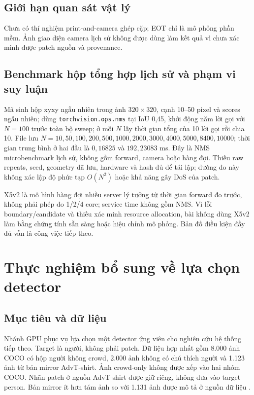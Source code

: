 \documentclass[a4paper,fleqn]{cas-dc}
\newif\ifbranchB
\begin{document}
\subsection{Giới hạn quan sát vật lý}
Chưa có thí nghiệm print-and-camera ghép cặp; EOT chỉ là mô phỏng phần mềm. Ảnh giao diện camera lịch sử không được dùng làm kết quả vì chưa xác minh được patch nguồn và provenance.

\subsection{Benchmark hộp tổng hợp lịch sử và phạm vi suy luận}
Mã  sinh hộp xyxy ngẫu nhiên trong ảnh $320\times320$, cạnh 10--50 pixel và scores ngẫu nhiên; dùng \texttt{torchvision.ops.nms} tại IoU 0,45, khởi động năm lời gọi với $N=100$ trước toàn bộ sweep; ở mỗi $N$ lấy thời gian tổng của 10 lời gọi rồi chia 10. File  lưu $N=10,\allowbreak 50,\allowbreak 100,\allowbreak 200,\allowbreak 500,\allowbreak 1000,\allowbreak 2000,\allowbreak 3000,\allowbreak 4000,\allowbreak 5000,\allowbreak 8400,\allowbreak 10000$; thời gian trung bình ở hai đầu là $0{,}16825$ và $192{,}23083$ ms. Đây là NMS microbenchmark lịch sử, không gồm forward, camera hoặc hàng đợi. Thiếu raw repeats, seed, geometry đã lưu, hardware và hash đủ để tái lập; đường đo này không xác lập độ phức tạp $O(N^2)$ hoặc khả năng gây DoS của patch.

X5v2 là mô hình hàng đợi nhiều server lý tưởng từ thời gian forward đo trước, không phải phép đo 1/2/4 core; service time không gồm NMS. Vì lỗi boundary/candidate và thiếu xác minh resource allocation, bài không dùng X5v2 làm bằng chứng tính sẵn sàng hoặc hiệu chỉnh mô phỏng. Bản đồ điều kiện đầy đủ vẫn là công việc tiếp theo.

\ifbranchB
\section{Thực nghiệm bổ sung về lựa chọn detector}

\subsection{Mục tiêu và dữ liệu}

Nhánh GPU phục vụ lựa chọn một detector ứng viên cho nghiên cứu hệ thống tiếp theo. Target là người, không phải patch. Dữ liệu hợp nhất gồm 8.000 ảnh COCO có hộp người không crowd, 2.000 ảnh không có chú thích người và 1.123 ảnh từ bản mirror AdvT-shirt. Ảnh crowd-only không được xếp vào hai nhóm COCO. Nhãn patch ở nguồn AdvT-shirt được giữ riêng, không đưa vào target person. Bản mirror ít hơn tám ảnh so với 1.131 ảnh được mô tả ở nguồn dữ liệu \cite{badpatch2025}.
\end{document}
